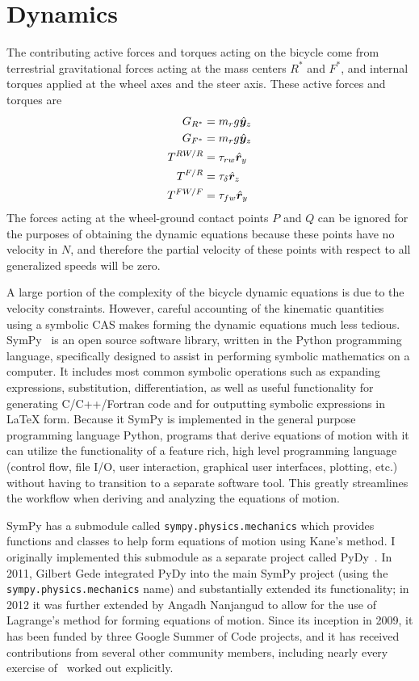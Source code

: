 \section{Dynamics} \label{model:dynamics}
The contributing active forces and torques acting on the bicycle come from
terrestrial gravitational forces acting at the mass centers $R^*$ and $F^*$,
and internal torques applied at the wheel axes and the steer axis. These
active forces and torques are
\begin{align}
  G_{R^*} &= m_r g \hat{\boldsymbol{y}}_{z} \\
  G_{F^*} &= m_r g \hat{\boldsymbol{y}}_{z} \\
  T^{RW/R}&= \tau_{rw} \hat{\boldsymbol{r}}_{y} \\
  T^{F/R}&= \tau_{\delta} \hat{\boldsymbol{r}}_{z} \\
  T^{FW/F}&= \tau_{fw} \hat{\boldsymbol{r}}_{y}
\end{align}
The forces acting at the wheel-ground contact points $P$ and $Q$ can be ignored
for the purposes of obtaining the dynamic equations because these points have
no velocity in $N$, and therefore the partial velocity of these points with
respect to all generalized speeds will be zero.

A large portion of the complexity of the bicycle dynamic equations is due to
the velocity constraints. However, careful accounting of the kinematic
quantities using a symbolic CAS makes forming the dynamic equations much less
tedious. SymPy~\cite{SymPy} is an open source software library, written in the
Python programming language, specifically designed to assist in performing
symbolic mathematics on a computer. It includes most common symbolic operations
such as expanding expressions, substitution, differentiation, as well as useful
functionality for generating C/C++/Fortran code and for outputting symbolic
expressions in \LaTeX{} form. Because it SymPy is implemented in the general
purpose programming language Python, programs that derive equations of motion
with it can utilize the functionality of a feature rich, high level programming
language (control flow, file I/O, user interaction, graphical user interfaces,
plotting, etc.) without having to transition to a separate software tool. This
greatly streamlines the workflow when deriving and analyzing the equations of
motion.

SymPy has a submodule called \verb|sympy.physics.mechanics| which provides
functions and classes to help form equations of motion using Kane's method. I
originally implemented this submodule as a separate project called
PyDy~\cite{PyDy}. In 2011, Gilbert Gede integrated PyDy into the main SymPy
project (using the \verb|sympy.physics.mechanics| name) and substantially
extended its functionality; in 2012 it was further extended by Angadh Nanjangud
to allow for the use of Lagrange's method for forming equations of motion.
Since its inception in 2009, it has been funded by three Google Summer of Code
projects, and it has received contributions from several other community
members, including nearly every exercise of~\cite{Kane1985} worked out
explicitly.

